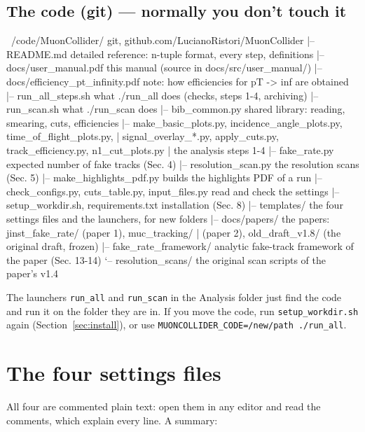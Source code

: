 \documentclass[11pt,letterpaper]{article}
\newcommand{\code}[1]{\texttt{#1}}
\begin{document}
\subsection{The code (git) --- normally you don't touch it}
\begin{tree}
~/code/MuonCollider/            git, github.com/LucianoRistori/MuonCollider
|-- README.md                  detailed reference: n-tuple format, every step, definitions
|-- docs/user_manual.pdf       this manual (source in docs/src/user_manual/)
|-- docs/efficiency_pt_infinity.pdf   note: how efficiencies for pT -> inf are obtained
|-- run_all_steps.sh           what ./run_all does (checks, steps 1-4, archiving)
|-- run_scan.sh                what ./run_scan does
|-- bib_common.py              shared library: reading, smearing, cuts, efficiencies
|-- make_basic_plots.py, incidence_angle_plots.py, time_of_flight_plots.py,
|   signal_overlay_*.py, apply_cuts.py, track_efficiency.py, n1_cut_plots.py
|                              the analysis steps 1-4
|-- fake_rate.py               expected number of fake tracks (Sec. 4)
|-- resolution_scan.py         the resolution scans (Sec. 5)
|-- make_highlights_pdf.py     builds the highlights PDF of a run
|-- check_configs.py, cuts_table.py, input_files.py   read and check the settings
|-- setup_workdir.sh, requirements.txt   installation (Sec. 8)
|-- templates/                 the four settings files and the launchers, for new folders
|-- docs/papers/               the papers: jinst_fake_rate/ (paper 1), muc_tracking/
|                              (paper 2), old_draft_v1.8/ (the original draft, frozen)
|-- fake_rate_framework/       analytic fake-track framework of the paper (Sec. 13-14)
`-- resolution_scans/          the original scan scripts of the paper's v1.4
\end{tree}
The launchers \code{run\_all} and \code{run\_scan} in the Analysis folder
just find the code and run it on the folder they are in. If you move the
code, run \code{setup\_workdir.sh} again (Section~\ref{sec:install}), or
use \code{MUONCOLLIDER\_CODE=/new/path ./run\_all}.

\section{The four settings files}
All four are commented plain text: open them in any editor and read the
comments, which explain every line. A summary:
\end{document}
